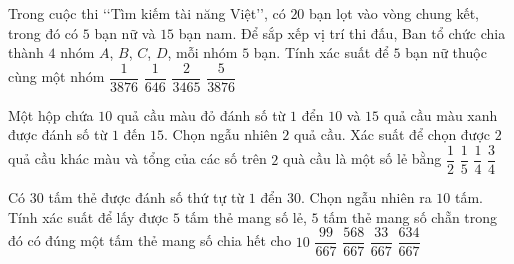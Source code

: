 \begin{ex}%
Trong cuộc thi \lq\lq Tìm kiếm tài năng Việt\rq\rq, có $20$ bạn lọt vào vòng chung kết, trong đó có $5$ bạn nữ và $15$ bạn nam. Để sắp xếp vị trí thi đấu, Ban tổ chức chia thành $4$ nhóm $A$, $B$, $C$, $D$, mỗi nhóm $5$ bạn. Tính xác suất để $5$ bạn nữ thuộc cùng một nhóm
\choice
{$\dfrac{1}{3876}$}
{\True $\dfrac{1}{646}$}
{$\dfrac{2}{3465}$}
{$\dfrac{5}{3876}$}
\end{ex}

\begin{ex}%
Một hộp chứa $10$ quả cầu màu đỏ đánh số từ $1$ đển $10$ và $15$ quả cầu màu xanh được đánh số từ $1$ đến $15$. Chọn ngẫu nhiên $2$ quả cầu. Xác suất để chọn được $2$ quả cầu khác màu và tổng của các số trên $2$ quà cầu là một số lẻ bằng
\choice
{$\dfrac{1}{2}$}
{$\dfrac{1}{5}$}
{\True $\dfrac{1}{4}$}
{$\dfrac{3}{4}$}
\end{ex}

\begin{ex}%
Có $30$ tấm thẻ được đánh số thứ tự từ $1$ đển $30$. Chọn ngẫu nhiên ra $10$ tấm. Tính xác suất để lấy được $5$ tấm thẻ mang số lẻ, $5$ tấm thẻ mang số chẵn trong đó có đúng một tấm thẻ mang số chia hết cho $10$
\choice
{\True $\dfrac{99}{667}$}
{$\dfrac{568}{667}$}
{$\dfrac{33}{667}$}
{$\dfrac{634}{667}$}
\end{ex}

